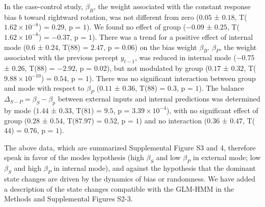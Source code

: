 \documentclass[
]{article}
\begin{document}
In the case-control study, \(\beta_B\), the weight associated with the
constant response bias \(b\) toward rightward rotation, was not
different from zero (\(0.05\) ± \(0.18\),
T(\(\ensuremath{1.62\times 10^{-8}}\)) = \(0.29\), p = \(1\)). We found
no effect of group (\(-0.09\) ± \(0.25\),
T(\(\ensuremath{1.62\times 10^{-8}}\)) = \(-0.37\), p = \(1\)). There
was a trend for a positive effect of internal mode (\(0.6\) ± \(0.24\),
T(\(88\)) = \(2.47\), p = \(0.06\)) on the bias weight \(\beta_B\).
\(\beta_P\), the weight associated with the previous percept
\(y_{t-1}\), was reduced in internal mode (\(-0.75\) ± \(0.26\),
T(\(88\)) = \(-2.92\), p = \(0.02\)), but not modulated by group
(\(0.17\) ± \(0.32\), T(\(\ensuremath{9.88\times 10^{-10}}\)) =
\(0.54\), p = \(1\)). There was no significant interaction between group
and mode with respect to \(\beta_P\) (\(0.11\) ± \(0.36\), T(\(88\)) =
\(0.3\), p = \(1\)). The balance \(\Delta_{S-P} = \beta_S - \beta_p\)
between external inputs and internal predictions was determined by mode
(\(1.44\) ± \(0.33\), T(\(81\)) = \(9.5\), p =
\(\ensuremath{3.39\times 10^{-4}}\)), with no significant effect of
group (\(0.28\) ± \(0.54\), T(\(87.97\)) = \(0.52\), p = \(1\)) and no
interaction (\(0.36\) ± \(0.47\), T(\(44\)) = \(0.76\), p = \(1\)).

The above data, which are summarized Supplemental Figure S3 and 4,
therefore speak in favor of the modes hypothesis (high \(\beta_S\) and
low \(\beta_P\) in external mode; low \(\beta_S\) and high \(\beta_P\)
in internal mode), and against the hypothesis that the dominant state
changes are driven by the dynamics of bias or randomness. We have added
a description of the state changes compatible with the GLM-HMM in the
Methods and Supplemental Figures S2-3.
\end{document}
